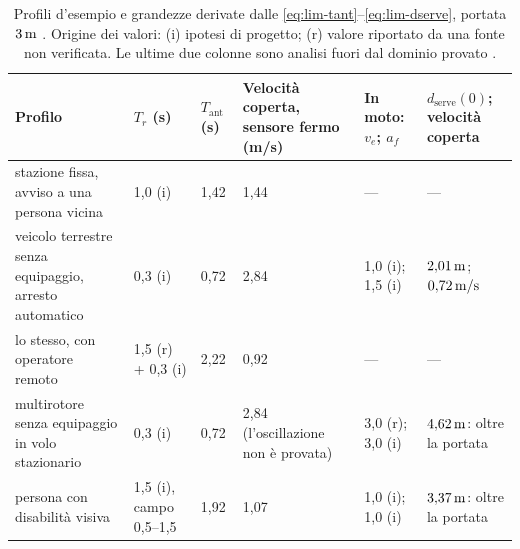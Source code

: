 \begin{table}[H]\centering\small
\caption{Profili d'esempio e grandezze derivate dalle \eqref{eq:lim-tant}--\eqref{eq:lim-dserve}, portata $3\unita{m}$ . Origine dei valori: (i) ipotesi di progetto; (r) valore riportato da una fonte non verificata. Le ultime due colonne sono analisi fuori dal dominio provato .}\label{tab:lim-portatore}
\begin{tabularx}{\linewidth}{@{}Lp{1.9cm}p{1.0cm}p{2.2cm}p{1.7cm}p{2.5cm}@{}}
\toprule
Profilo & $T_r$ (s) & $T_{\mathrm{ant}}$ (s) & Velocità coperta, sensore fermo (m/s) & In moto: $v_e$; $a_f$ & $d_{\mathrm{serve}}(0)$; velocità coperta\\
\midrule
stazione fissa, avviso a una persona vicina & 1,0 (i) & 1,42 & 1,44 & --- & ---\\
veicolo terrestre senza equipaggio, arresto automatico & 0,3 (i) & 0,72 & 2,84 & 1,0 (i); 1,5 (i) & $2{,}01\,\mathrm{m}$; $0{,}72\,\mathrm{m/s}$\\
lo stesso, con operatore remoto & 1,5 (r) + 0,3 (i) & 2,22 & 0,92 & --- & ---\\
multirotore senza equipaggio in volo stazionario & 0,3 (i) & 0,72 & 2,84 (l'oscillazione non è provata) & 3,0 (r); 3,0 (i) & $4{,}62\,\mathrm{m}$: oltre la portata\\
persona con disabilità visiva & 1,5 (i), campo 0,5--1,5 & 1,92 & 1,07 & 1,0 (i); 1,0 (i) & $3{,}37\,\mathrm{m}$: oltre la portata\\
\bottomrule
\end{tabularx}
\end{table}

